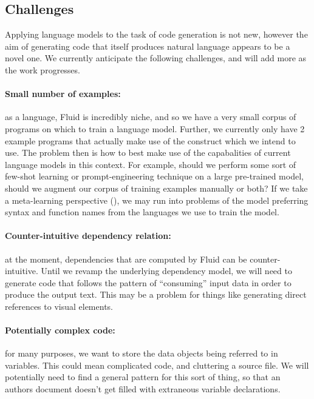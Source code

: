 \subsection{Challenges}
Applying language models to the task of code generation is not new, however the aim of generating code that
itself produces natural language appears to be a novel one. We currently anticipate the following challenges,
and will add more as the work progresses.

\paragraph{Small number of examples:} as a language, Fluid is incredibly niche, and so we have a very small corpus
of programs on which to train a language model. Further, we currently only have 2 example programs that actually make
use of the  construct which we intend to use. The problem then is how to best make use of the capabalities
of current language models in this context. For example, should we perform some sort of few-shot learning or prompt-engineering
technique on a large pre-trained model, should we augment our corpus of training examples manually or both? If we take a meta-learning
perspective (), we may run into problems of the model preferring syntax and function names from the languages we use to
train the model.

\paragraph{Counter-intuitive dependency relation:} at the moment, dependencies that are computed by Fluid can be counter-intuitive.
Until we revamp the underlying dependency model, we will need to generate code that follows the pattern of ``consuming'' input
data in order to produce the output text. This may be a problem for things like generating direct references to visual elements.

\paragraph{Potentially complex code:} for many purposes, we want to store the data objects being referred to in variables. This 
could mean complicated code, and cluttering a source file. We will potentially need to find a general pattern for this sort of thing,
so that an authors document doesn't get filled with extraneous variable declarations. 